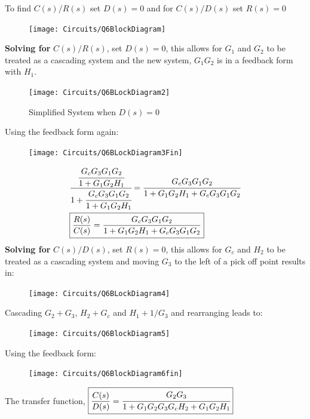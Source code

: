\documentclass[12pt]{article}
\newenvironment{problem}[2][Problem]{\begin{trivlist}
		\item[\hskip \labelsep {\bfseries #1}\hskip \labelsep {\bfseries #2.}]}{\end{trivlist}}
\begin{document}
\begin{problem}[{Problem }6 --- (B)-2-7 --- find C(s)/R(s) and C(s)/D(s)] \hfill \break
	\hfill \break
To find $ C(s)/R(s)$ set $D(s)=0$ and  for $C(s)/D(s)$ set $R(s)=0$
\begin{figure}[!h]
	\centering
	\texttt{[image: Circuits/Q6BlockDiagram]}
	\label{fig:q6blockdiagram}
\end{figure} \newline
\textbf{Solving for } $C(s)/R(s)$, set $D(s)=0$, this allows for $G_1$ and $G_2$ to be treated as a cascading system and the new system, $G_1G_2$ is in a feedback form with $H_1$. 
\begin{figure}[H]
	\centering
	\texttt{[image: Circuits/Q6BLockDiagram2]}
	\caption{Simplified System when $D(s)=0$}
	\label{fig:q6blockdiagram2}
\end{figure}
Using the feedback form again:
\begin{figure}[H]
	\centering
	\texttt{[image: Circuits/Q6BLockDiagram3Fin]}
	\label{fig:q6blockdiagram3fin}
\end{figure}
\vspace{-0.5cm}
\begin{align*}
& \cfrac{\cfrac{G_cG_3G_1G_2}{1+G_1G_2H_1}}{1+\cfrac{G_cG_3G_1G_2}{1+G_1G_2H_1}} = 
\cfrac{G_cG_3G_1G_2}{1+G_1G_2H_1+G_cG_3G_1G_2}\\
& \boxed{\frac{R(s)}{C(s)} = \frac{G_cG_3G_1G_2}{1+G_1G_2H_1+G_cG_3G_1G_2}}
\end{align*}
\textbf{Solving for } $C(s)/D(s)$, set $R(s)=0$, this allows for $G_c$ and $H_2$ to be treated as a cascading system and moving $G_3$ to the left of a pick off point results in:
\begin{figure}[H]
	\centering
	\texttt{[image: Circuits/Q6BLockDiagram4]}
	\label{fig:Q6BLockDiagram4}
\end{figure}
Cascading $G_2 + G_3$, $H_2 + G_c$ and $H_1+ 1 / G_3$ and rearranging leads to:
\begin{figure}[H]
	\centering
	\texttt{[image: Circuits/Q6BlockDiagram5]}
	\label{fig:q6blockdiagram5}
\end{figure}
Using the feedback form:
\begin{figure}[H]
	\centering
	\texttt{[image: Circuits/Q6BlockDiagram6fin]}
	\label{fig:q6blockdiagram6fin}
\end{figure}
The transfer function, $\displaystyle \boxed{\frac{C(s)}{D(s)}= \cfrac{G_2G_3}{1+G_1G_2G_3G_cH_2+G_1G_2H_1}}$
\end{problem}
\end{document}
